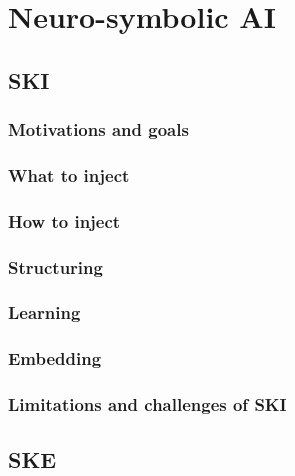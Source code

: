 
\chapter{Neuro-symbolic AI}
\label{ch:nesy-ai}

\section{\Acl{SKI}}\label{sec:ski}

\subsection{Motivations and goals}\label{subsec:ski-motivations-and-goals}

\subsection{What to inject}\label{subsec:what-to-inject}

\subsection{How to inject}\label{subsec:how-to-inject}

\subsection{Structuring}\label{subsec:structuring}

\subsection{Learning}\label{subsec:learning}

\subsection{Embedding}\label{subsec:ski-embedding}

\subsection{Limitations and challenges of \ac{SKI}}\label{subsec:limitations-and-challenges-of-ski}

\section{\Acl{SKE}}\label{sec:ske}


